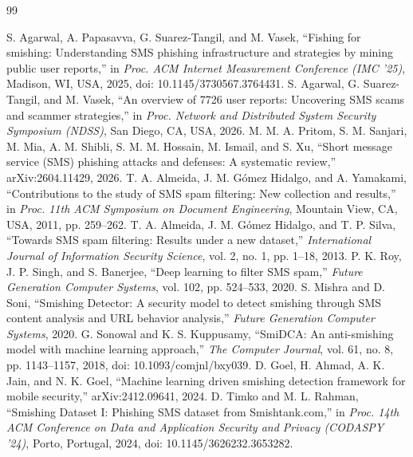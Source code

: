 \documentclass[12pt,a4paper]{report}
\begin{document}
\clearpage
\renewcommand{\bibname}{References}
\begin{thebibliography}{99}
 S. Agarwal, A. Papasavva, G. Suarez-Tangil, and M. Vasek, ``Fishing for smishing: Understanding SMS phishing infrastructure and strategies by mining public user reports,'' in \textit{Proc. ACM Internet Measurement Conference (IMC '25)}, Madison, WI, USA, 2025, doi: 10.1145/3730567.3764431.
 S. Agarwal, G. Suarez-Tangil, and M. Vasek, ``An overview of 7726 user reports: Uncovering SMS scams and scammer strategies,'' in \textit{Proc. Network and Distributed System Security Symposium (NDSS)}, San Diego, CA, USA, 2026.
 M. M. A. Pritom, S. M. Sanjari, M. Mia, A. M. Shibli, S. M. M. Hossain, M. Ismail, and S. Xu, ``Short message service (SMS) phishing attacks and defenses: A systematic review,'' arXiv:2604.11429, 2026.
 T. A. Almeida, J. M. G\'omez Hidalgo, and A. Yamakami, ``Contributions to the study of SMS spam filtering: New collection and results,'' in \textit{Proc. 11th ACM Symposium on Document Engineering}, Mountain View, CA, USA, 2011, pp. 259--262.
 T. A. Almeida, J. M. G\'omez Hidalgo, and T. P. Silva, ``Towards SMS spam filtering: Results under a new dataset,'' \textit{International Journal of Information Security Science}, vol. 2, no. 1, pp. 1--18, 2013.
 P. K. Roy, J. P. Singh, and S. Banerjee, ``Deep learning to filter SMS spam,'' \textit{Future Generation Computer Systems}, vol. 102, pp. 524--533, 2020.
 S. Mishra and D. Soni, ``Smishing Detector: A security model to detect smishing through SMS content analysis and URL behavior analysis,'' \textit{Future Generation Computer Systems}, 2020.
 G. Sonowal and K. S. Kuppusamy, ``SmiDCA: An anti-smishing model with machine learning approach,'' \textit{The Computer Journal}, vol. 61, no. 8, pp. 1143--1157, 2018, doi: 10.1093/comjnl/bxy039.
 D. Goel, H. Ahmad, A. K. Jain, and N. K. Goel, ``Machine learning driven smishing detection framework for mobile security,'' arXiv:2412.09641, 2024.
 D. Timko and M. L. Rahman, ``Smishing Dataset I: Phishing SMS dataset from Smishtank.com,'' in \textit{Proc. 14th ACM Conference on Data and Application Security and Privacy (CODASPY '24)}, Porto, Portugal, 2024, doi: 10.1145/3626232.3653282.

\end{thebibliography}
\end{document}
